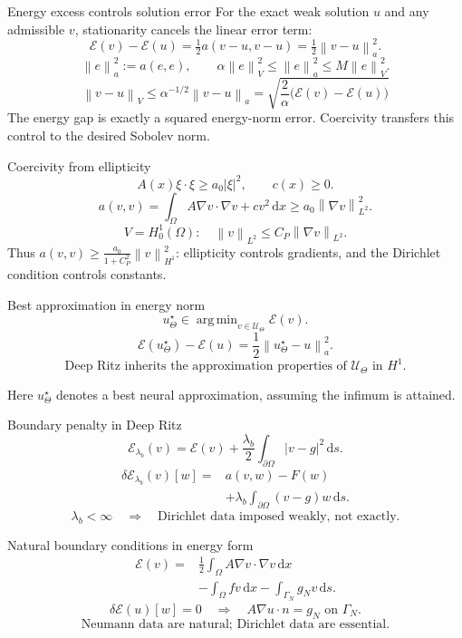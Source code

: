 \documentclass[aspectratio=43,11pt]{beamer}
\newcommand{\slideid}{L3}
\newcommand{\dd}{\,\mathrm d}
\newcommand{\U}{\mathcal{U}}
\newcommand{\Energy}{\mathcal{E}}
\newcommand{\norm}[1]{\left\lVert #1\right\rVert}
\DeclareMathOperator*{\argmin}{arg\,min}
\newcommand{\labnote}[1]{{\scriptsize\color{courseBlue}#1\par}}
\begin{document}
\renewcommand{\slideid}{L3-S063}
\begin{frame}[c]{Energy excess controls solution error}
\small
For the exact weak solution $u$ and any admissible $v$, stationarity cancels the linear error term:
\[
\Energy(v)-\Energy(u)
=\tfrac12 a(v-u,v-u)
=\tfrac12\norm{v-u}_a^2.
\]
\[
\norm{e}_{a}^2:=a(e,e),\qquad
\alpha\norm{e}_V^2\le\norm{e}_a^2\le M\norm{e}_V^2.
\]
\[
\boxed{
\norm{v-u}_{V}
\le \alpha^{-1/2}\norm{v-u}_{a}
=\sqrt{\frac{2}{\alpha}\bigl(\Energy(v)-\Energy(u)\bigr)}
}
\]
\medskip
The energy gap is exactly a squared energy-norm error. Coercivity transfers this control to the desired Sobolev norm.
\end{frame}

\renewcommand{\slideid}{L3-S065}
\begin{frame}[c]{Coercivity from ellipticity}
\small
\[
A(x)\xi\cdot\xi\ge a_0|\xi|^2,
\qquad c(x)\ge0.
\]
\[
a(v,v)=\int_\Omega A\nabla v\cdot\nabla v+c v^2\dd x
\ge a_0\norm{\nabla v}_{L^2}^2.
\]
\[
V=H_0^1(\Omega):
\quad
\norm{v}_{L^2}\le C_P\norm{\nabla v}_{L^2}.
\]
Thus $a(v,v)\ge \frac{a_0}{1+C_P^2}\norm{v}_{H^1}^2$:
ellipticity controls gradients, and the Dirichlet condition controls constants.
\end{frame}

\renewcommand{\slideid}{L3-S066}
\begin{frame}[c]{Best approximation in energy norm}
\small
\[
u_\Theta^\star\in\argmin_{v\in\U_\Theta}\Energy(v).
\]
\[
\Energy(u_\Theta^\star)-\Energy(u)
=\frac12\norm{u_\Theta^\star-u}_{a}^2.
\]
\[
\text{Deep Ritz inherits the approximation properties of }\U_\Theta\text{ in }H^1.
\]
\labnote{Here $u_\Theta^\star$ denotes a best neural approximation, assuming the infimum is attained.}
\end{frame}

\renewcommand{\slideid}{L3-S070}
\begin{frame}[c]{Boundary penalty in Deep Ritz}
\small
\[
\Energy_{\lambda_b}(v)=\Energy(v)+\frac{\lambda_b}{2}
\int_{\partial\Omega}|v-g|^2\dd s.
\]
\[
\begin{aligned}
\delta \Energy_{\lambda_b}(v)[w]={}&a(v,w)-F(w)\\
&+\lambda_b\int_{\partial\Omega}(v-g)w\dd s.
\end{aligned}
\]
\[
\lambda_b<\infty
\quad\Rightarrow\quad
\text{Dirichlet data imposed weakly, not exactly.}
\]
\end{frame}

\renewcommand{\slideid}{L3-S072}
\begin{frame}[c]{Natural boundary conditions in energy form}
\small
\[
\begin{aligned}
\Energy(v)={}&\frac12\int_\Omega A\nabla v\cdot\nabla v\dd x\\
&-\int_\Omega fv\dd x-\int_{\Gamma_N}g_Nv\dd s.
\end{aligned}
\]
\[
\delta \Energy(u)[w]=0
\quad\Rightarrow\quad
A\nabla u\cdot n=g_N \text{ on }\Gamma_N.
\]
\[
\text{Neumann data are natural; Dirichlet data are essential.}
\]
\end{frame}
\end{document}
